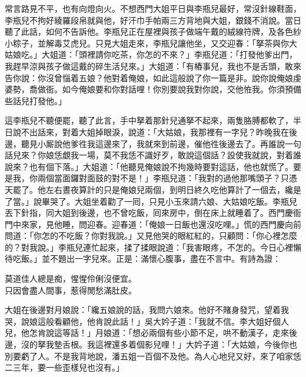常言路見不平，也有向燈向火。不想西門大姐平日與李瓶兒最好，常沒針線鞋面，李瓶兒不拘好綾羅段帛就與他，好汗巾手帕兩三方背地與大姐，銀錢不消說。當日聽了此話，如何不告訴他。李瓶兒正在屋裡與孩子做端午戴的絨線符牌，及各色紗小粽子，並解毒艾虎兒。{}只見大姐走來，李瓶兒讓他坐，又交迎春：「拏茶與你大姑娘吃。」大姐道：「頭裡請你吃茶，你怎的不來？」李瓶兒道：「打發他爹出門，我趕早涼與孩子做這戴的碎生活兒來。」大姐道：「有樁事兒，我也不是舌頭，敢來告你說：你沒曾惱着五娘？他對着俺娘，如此這般說了你一篇是非。說你說俺娘虔婆勢，喬做衙。如今俺娘要和你對話哩！你別要說我對你說，交他恠我。你須預備些話兒打發他。」

這李瓶兒不聽便罷，聽了此言，手中拏着那針兒通拏不起來，兩隻胳膊都軟了，半日說不出話來，對着大姐掉眼淚，說道：「大姑娘，我那裡有一字兒？昨晚我在後邊，聽見小厮說他爹徃我這邊來了，我就來到前邊，催他徃後邊去了。再誰說一句話兒來？你娘恁覷我一場，莫不我恁不識好歹，敢說這個話？設使我就說，對着誰說來？也有個下落。」大姐道：「他聽見俺娘說不拘幾時要對這話，他也就慌了。要是我，你兩個當面鑼對面鼓的對不是！」李瓶兒道：「我對的過他那嘴頭子？只憑天罷了。他左右晝夜算計的只是俺娘兒兩個，到明日終久吃他算計了一個去，纔是了當。」{}說畢哭了。大姐坐着勸了一囘，只見小玉來請六娘、大姑娘吃飯。李瓶兒丟下針指，同大姐到後邊，也不曾吃飯，囘來房中，倒在床上就睡着了。西門慶衙門中來家，見他睡，問迎春。迎春道：「俺娘一日飯也還沒吃哩。」慌的西門慶向前問道：「你怎的不吃飯？你對我說。」又見他哭的眼紅紅的，只顧問：「你心裡怎麼的？對我說。」李瓶兒連忙起來，揉了揉眼說道：「我害眼疼，不怎的。今日心裡懶待吃飯。」並不題出一字兒來。正是：滿懷心腹事，盡在不言中。有詩為證：

\begin{myquote} 
莫道佳人總是痴，惺惺伶俐沒便宜。\\只因會盡人間事，惹得閒愁滿肚皮。
\end{myquote} 

大姐在後邊對月娘說：「纔五娘說的話，我問六娘來。他好不賭身發咒，望着我哭，說娘這般看顧他，他肯說此話！」吳大妗子道：「我就不信。李大姐好個人兒，他怎肯說這等話！」月娘道：「想必兩個有些小節不足，哄不動漢子，走來後邊，沒的拏我墊舌根。我這裡還多着個影兒哩！」{}大妗子道：「大姑娘，今後你也別要虧了人。不是我背地說，潘五姐一百個不及他。為人心地兒又好，來了咱家恁二三年，要一些歪樣兒也沒有。」


